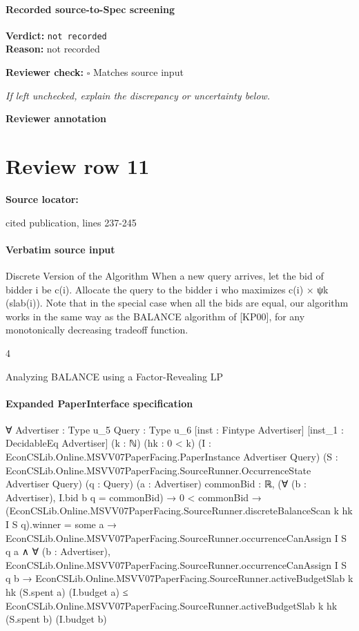 \documentclass[10pt]{article}
\newcommand{\reviewerbox}{%
  \par\noindent\fbox{\parbox{0.96\linewidth}{\rule{0pt}{0.38in}}}\par
}
\newcommand{\reviewmatch}[1]{%
  \par\noindent\textbf{Reviewer check:} $\square$\; #1\par
  \noindent\emph{If left unchecked, explain the discrepancy or uncertainty below.}\par
}
\begin{document}
\paragraph{Recorded source-to-Spec screening}
\textbf{Verdict:} \texttt{not recorded}
\\
\textbf{Reason:} not recorded
\reviewmatch{Matches source input}
\noindent\textbf{Reviewer annotation}\par
\reviewerbox
\clearpage
\hypertarget{source-claim-118770ec0ef80170}{}
\section*{Review row 11}
\textbf{Source locator:} {\footnotesize\raggedright cited publication, lines 237-\allowbreak{}245\par}
\paragraph{Verbatim source input}
\begin{ReviewVerbatim}
Discrete Version of the Algorithm
When a new query arrives, let the bid of bidder i be c(i). Allocate the query to the
bidder i who maximizes c(i) × ψk (slab(i)).
Note that in the special case when all the bids are equal, our algorithm works in the same way
as the BALANCE algorithm of [KP00], for any monotonically decreasing tradeoff function.

4

Analyzing BALANCE using a Factor-Revealing LP
\end{ReviewVerbatim}


\paragraph{Expanded PaperInterface specification}
\begin{ReviewVerbatim}
∀ {Advertiser : Type u_5} {Query : Type u_6} [inst : Fintype Advertiser] [inst_1 : DecidableEq Advertiser] (k : ℕ)
  (hk : 0 < k) (I : EconCSLib.Online.MSVV07PaperFacing.PaperInstance Advertiser Query)
  (S : EconCSLib.Online.MSVV07PaperFacing.SourceRunner.OccurrenceState Advertiser Query) (q : Query) (a : Advertiser)
  {commonBid : ℝ},
  (∀ (b : Advertiser), I.bid b q = commonBid) →
    0 < commonBid →
      (EconCSLib.Online.MSVV07PaperFacing.SourceRunner.discreteBalanceScan k hk I S q).winner = some a →
        EconCSLib.Online.MSVV07PaperFacing.SourceRunner.occurrenceCanAssign I S q a ∧
          ∀ (b : Advertiser),
            EconCSLib.Online.MSVV07PaperFacing.SourceRunner.occurrenceCanAssign I S q b →
              EconCSLib.Online.MSVV07PaperFacing.SourceRunner.activeBudgetSlab k hk (S.spent a) (I.budget a) ≤
                EconCSLib.Online.MSVV07PaperFacing.SourceRunner.activeBudgetSlab k hk (S.spent b) (I.budget b)
\end{ReviewVerbatim}
\end{document}
